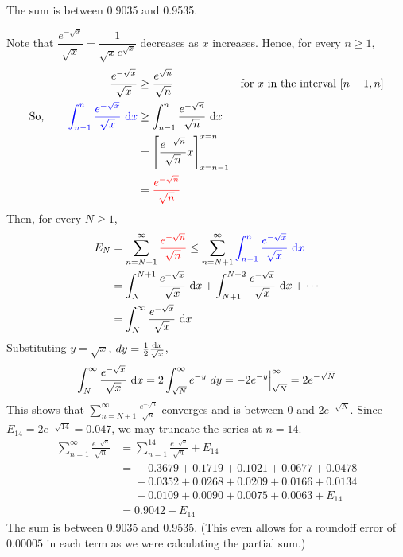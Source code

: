 \begin{answer}
The sum is between 0.9035 and 0.9535.
\end{answer}

\begin{solution}
Note that $\dfrac{e^{-\sqrt{x}}}{\sqrt{x}}=\dfrac{1}{\sqrt{x}e^{\sqrt{x}}}$ decreases as $x$
increases. Hence, for every $n\ge 1$,
\begin{align*}
\frac{e^{-\sqrt{x}}}{\sqrt{x}} &\geq \frac{e^{\sqrt{n}}}{\sqrt{n}}&\mbox{for $x$ in the interval $[n-1,n]$}\\
\mbox{So,}\qquad\color{blue} \int_{n-1}^n \frac{e^{-\sqrt{x}}}{\sqrt{x}}\ \mathrm{d}x&\geq\int_{n-1}^n \frac{e^{-\sqrt{n}}}{\sqrt{n}}\ \mathrm{d}x\\
&=\left[\frac{e^{-\sqrt{n}}}{\sqrt{n}}x\right]_{x=n-1}^{x=n}\\
&=\color{red}\frac{e^{-\sqrt{n}}}{\sqrt{n}}
\end{align*}
Then, for every $N\ge 1$,
\begin{align*}
E_N&=\sum_{n=N+1}^\infty\textcolor{red}{\frac{e^{-\sqrt{n}}}{\sqrt{n}}}
\le \sum_{n=N+1}^\infty\textcolor{blue}{\int_{n-1}^n \frac{e^{-\sqrt{x}}}{\sqrt{x}}\ \mathrm{d}x}
\\&=\int_{N}^{N+1}\frac{e^{-\sqrt{x}}}{\sqrt{x}}\ \mathrm{d}x
+\int_{N+1}^{N+2} \frac{e^{-\sqrt{x}}}{\sqrt{x}}\ \mathrm{d}x+\cdots\\
&=\int_{N}^\infty \frac{e^{-\sqrt{x}}}{\sqrt{x}}\ \mathrm{d}x
\end{align*}
Substituting $y=\sqrt{x}$, $dy=\tfrac{1}{2}\frac{\mathrm{d}x}{\sqrt{x}}$,
\begin{align*}
\int_{N}^\infty \frac{e^{-\sqrt{x}}}{\sqrt{x}}\ \mathrm{d}x
=2\int_{\sqrt{N}}^\infty e^{-y}\ dy
=-2e^{-y}\Big|_{\sqrt{N}}^\infty
=2e^{-\sqrt{N}}
\end{align*}
This shows that $\sum_{n=N+1}^\infty\frac{e^{-\sqrt{n}}}{\sqrt{n}}$
converges and is between $0$ and $2e^{-\sqrt{N}}$. Since
$E_{14}=2e^{-\sqrt{14}}=0.047$, we may truncate the series at $n=14$.
\begin{align*}
\sum_{n=1}^\infty\frac{e^{-\sqrt{n}}}{\sqrt{n}}
&=\sum_{n=1}^{14}\frac{e^{-\sqrt{n}}}{\sqrt{n}}+E_{14}\\
&=\phantom{+}0.3679+0.1719+0.1021+0.0677+0.0478\\
&\phantom{=}+0.0352+0.0268+0.0209+0.0166+0.0134\\
&\phantom{=}+0.0109+0.0090+0.0075+0.0063+E_{14}\\
&=0.9042+E_{14}
\end{align*}
The sum is between 0.9035 and 0.9535. (This even allows for
a roundoff error of $0.00005$ in each term as we were calculating the partial sum.)
\end{solution}

